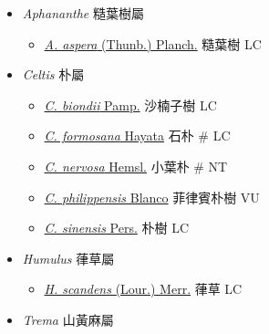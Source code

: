 
  \begin{itemize}
 \item[] \textit{Aphananthe} 糙葉樹屬
                                
  \begin{itemize}
        \item[] \href{http://www.theplantlist.org/tpl1.1/search?q=Aphananthe+aspera}{\textit{A. aspera} (Thunb.) Planch.}   糙葉樹   LC
  \end{itemize}
 \item[] \textit{Celtis} 朴屬
                                
  \begin{itemize}
        \item[] \href{http://www.theplantlist.org/tpl1.1/search?q=Celtis+biondii}{\textit{C. biondii} Pamp.}   沙楠子樹   LC
        \item[] \href{http://www.theplantlist.org/tpl1.1/search?q=Celtis+formosana}{\textit{C. formosana} Hayata}   石朴  \# LC
        \item[] \href{http://www.theplantlist.org/tpl1.1/search?q=Celtis+nervosa}{\textit{C. nervosa} Hemsl.}   小葉朴  \# NT
        \item[] \href{http://www.theplantlist.org/tpl1.1/search?q=Celtis+philippensis}{\textit{C. philippensis} Blanco}   菲律賓朴樹   VU
        \item[] \href{http://www.theplantlist.org/tpl1.1/search?q=Celtis+sinensis}{\textit{C. sinensis} Pers.}   朴樹   LC
  \end{itemize}
 \item[] \textit{Humulus} 葎草屬
                                
  \begin{itemize}
        \item[] \href{http://www.theplantlist.org/tpl1.1/search?q=Humulus+scandens}{\textit{H. scandens} (Lour.) Merr.}   葎草   LC
  \end{itemize}
 \item[] \textit{Trema} 山黃麻屬
                                

\end{itemize}

